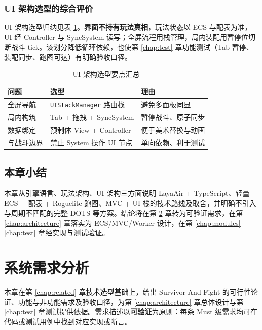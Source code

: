 \documentclass[UTF8,a4paper]{ctexart}
\begin{document}
\subsection{UI 架构选型的综合评价}

UI 架构选型归纳见表 \ref{tab:ui-arch-summary}。\textbf{界面不持有玩法真相}，玩法状态以 ECS 与配表为准，UI 经 Controller 与 SyncSystem 读写；全屏流程用栈管理，局内装配用暂停位切断战斗 tick。该划分降低循环依赖，也使第 \ref{chap:test} 章功能测试（Tab 暂停、装配同步、跑图可达）有明确验收口径。

\begin{table}[htbp]
  
  \caption{UI 架构选型要点汇总}
  \label{tab:ui-arch-summary}
  \begin{tabular}{p{3.0cm}p{4.0cm}p{5.5cm}}
    \toprule
    \textbf{问题} & \textbf{选型} & \textbf{理由} \\
    \midrule
    全屏导航 & \texttt{UIStackManager} 路由栈 & 避免多面板同显 \\
    局内构筑 & Tab + 拖拽 + SyncSystem & 暂停战斗、原子同步 \\
    数据绑定 & 预制体 View + Controller & 便于美术替换与动画 \\
    与战斗边界 & 禁止 System 操作 UI 节点 & 单向依赖、利于测试 \\
    \bottomrule
  \end{tabular}
\end{table}

\section{本章小结}

本章从引擎语言、玩法架构、UI 架构三方面说明 LayaAir + TypeScript、轻量 ECS + 配表 + Roguelite 跑图、MVC + UI 栈的技术路线及取舍，并明确不引入与周期不匹配的完整 DOTS 等方案。结论将在第 \ref{chap:requirement} 章转为可验证需求，在第 \ref{chap:architecture} 章落实为 ECS/MVC/Worker 设计，在第 \ref{chap:modules}--\ref{chap:test} 章经实现与测试验证\cite{ullmann2025sydra,gregory2018game,cantrell2018unity,heijstek2011empirical}。

\chapter{系统需求分析}
\label{chap:requirement}

本章在第 \ref{chap:related} 章技术选型基础上，给出 Survivor And Fight 的可行性论证、功能与非功能需求及验收口径，为第 \ref{chap:architecture} 章总体设计与第 \ref{chap:test} 章测试提供依据。需求描述以\textbf{可验证}为原则：每条 Must 级需求均可在代码或测试用例中找到对应实现或断言。
\end{document}

